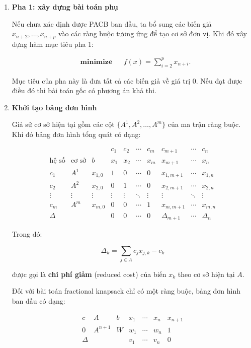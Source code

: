\documentclass[fontsize=13pt,a4paper]{report}
\begin{document}
\begin{enumerate}

    \item \textbf{Pha 1: xây dựng bài toán phụ}

    Nếu chưa xác định được PACB ban đầu, ta bổ sung các biến giả
    \(x_{n+2},\dots,x_{n+p}\) vào các ràng buộc tương ứng để tạo cơ sở đơn vị. Khi đó xây dựng hàm mục tiêu pha 1:

    \[
    \begin{aligned}
    & \textbf{minimize} && f(x)=\sum_{i=2}^{p} x_{n+i}.
    \end{aligned}
    \]

    Mục tiêu của pha này là đưa tất cả các biến giả về giá trị \(0\). Nếu đạt được điều đó thì bài toán gốc có phương án khả thi.

    \item \textbf{Khởi tạo bảng đơn hình}

    Giả sử cơ sở hiện tại gồm các cột
    \(\{A^1,A^2,\dots,A^m\}\) của ma trận ràng buộc. Khi đó bảng đơn hình tổng quát có dạng:

    \[
    \begin{array}{ccc|ccccccc}
     &  &  & c_1 & c_2 & \cdots & c_m & c_{m+1} & \cdots & c_n \\
    \text{hệ số} & \text{cơ sở} & b & x_1 & x_2 & \cdots & x_m & x_{m+1} & \cdots & x_n \\
    \hline
    c_1 & A^{1} & x_{1,0} & 1 & 0 & \cdots & 0 & x_{1,m+1} & \cdots & x_{1,n} \\
    c_2 & A^{2} & x_{2,0} & 0 & 1 & \cdots & 0 & x_{2,m+1} & \cdots & x_{2,n} \\
    \vdots & \vdots & \vdots & \vdots & \vdots & \ddots & \vdots & \vdots & \ddots & \vdots \\
    c_m & A^{m} & x_{m,0} & 0 & 0 & \cdots & 1 & x_{m,m+1} & \cdots & x_{m,n} \\
    \hline
    \Delta &  &  & 0 & 0 & \cdots & 0 & \Delta_{m+1} & \cdots & \Delta_n
    \end{array}
    \]

    Trong đó:

    \[
    \Delta_k=\sum_{j\in A} c_jx_{j,k}-c_k
    \]

    được gọi là \textbf{chi phí giảm} (reduced cost) của biến \(x_k\) theo cơ sở hiện tại \(A\).

    Đối với bài toán fractional knapsack chỉ có một ràng buộc, bảng đơn hình ban đầu có dạng:

    \[
    \begin{array}{ccc|cccc}
    c & A & b & x_1 & \cdots & x_n & x_{n+1} \\
    \hline
    0 & A^{n+1} & W & w_1 & \cdots & w_n & 1 \\
    \hline
    \Delta &  &  & v_1 & \cdots & v_n & 0
    \end{array}
    \]


\end{enumerate}
\end{document}
